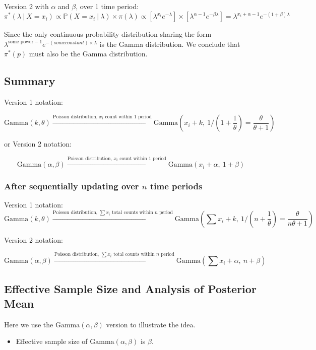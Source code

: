 \documentclass{article}
\begin{document}
Version 2 with $\alpha$ and $\beta$, over 1 time period:
$$ \pi^*(\lambda~|~X=x_i) \propto \mathbb{P}(X=x_i~|~\lambda)\times \pi(\lambda) \propto \left[\lambda^{x_i}e^{-\lambda}\right]\times\left[\lambda^{\alpha-1}e^{-\beta\lambda}\right]=\lambda^{x_i+\alpha-1}e^{-(1+\beta)\lambda} $$

Since the only continuous probability distribution sharing the form $\lambda^{\text{some power}-1}e^{-(some constant)\times \lambda}$ is the Gamma distribution. We conclude that $\pi^*(p)$ must also be the Gamma distribution.

\subsection{Summary}

Version 1 notation:

$$ \text{Gamma}(k, \theta)\xrightarrow{\text{Poisson distribution, $x_i$ count within 1 period}} \text{Gamma}\left(x_i+k,\ 1/(1+\frac{1}{\theta})=\frac{\theta}{\theta+1}\right) $$

or Version 2 notation:

$$ \text{Gamma}(\alpha, \beta)\xrightarrow{\text{Poisson distribution, $x_i$ count within 1 period}} \text{Gamma}(x_i+\alpha,\ 1+\beta) $$

\subsubsection*{After sequentially updating over $n$ time periods}

Version 1 notation:
$$ \text{Gamma}(k, \theta)\xrightarrow{\text{Poisson distribution, $\sum x_i$ total counts within $n$ period}} \text{Gamma}\left(\sum x_i+k,\ 1/(n+\frac{1}{\theta})=\frac{\theta}{n\theta +1}\right) $$

Version 2 notation:

$$ \text{Gamma}(\alpha, \beta)\xrightarrow{\text{Poisson distribution, $\sum x_i$ total counts within $n$ period}} \text{Gamma}\left(\sum x_i+\alpha,\ n+\beta\right) $$

\subsection{Effective Sample Size and Analysis of Posterior Mean}

Here we use the $\text{Gamma}(\alpha, \beta)$ version to illustrate the idea.
\begin{itemize}
	\item Effective sample size of $\text{Gamma}(\alpha, \beta)$ is $\beta$.
\end{itemize}
\end{document}

